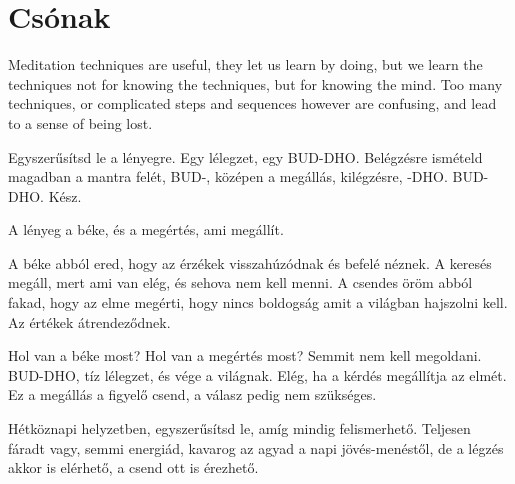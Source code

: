 \hypertarget{csuxf3nak-1}{%
\chapter{Csónak}\label{csuxf3nak-1}}

Meditation techniques are useful, they let us learn by doing, but we
learn the techniques not for knowing the techniques, but for knowing the
mind. Too many techniques, or complicated steps and sequences however
are confusing, and lead to a sense of being lost.

Egyszerűsítsd le a lényegre. Egy lélegzet, egy BUD-DHO. Belégzésre
ismételd magadban a mantra felét, BUD-, középen a megállás, kilégzésre,
-DHO. BUD-DHO. Kész.

A lényeg a béke, és a megértés, ami megállít.

A béke abból ered, hogy az érzékek visszahúzódnak és befelé néznek. A
keresés megáll, mert ami van elég, és sehova nem kell menni. A csendes
öröm abból fakad, hogy az elme megérti, hogy nincs boldogság amit a
világban hajszolni kell. Az értékek átrendeződnek.

Hol van a béke most? Hol van a megértés most? Semmit nem kell megoldani.
BUD-DHO, tíz lélegzet, és vége a világnak. Elég, ha a kérdés megállítja
az elmét. Ez a megállás a figyelő csend, a válasz pedig nem szükséges.

Hétköznapi helyzetben, egyszerűsítsd le, amíg mindig felismerhető.
Teljesen fáradt vagy, semmi energiád, kavarog az agyad a napi
jövés-menéstől, de a légzés akkor is elérhető, a csend ott is érezhető.
